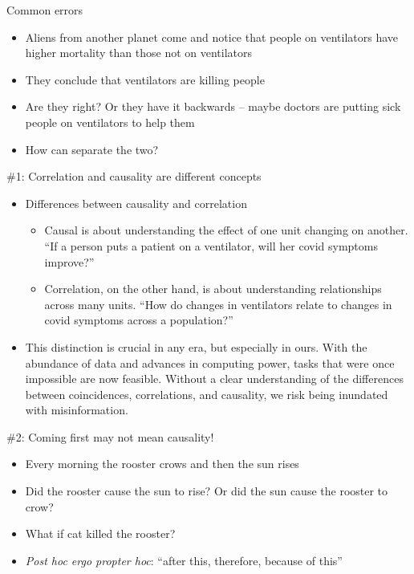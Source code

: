 \documentclass{beamer}
\begin{document}
\begin{frame}{Common errors}

  \begin{itemize}
    \item Aliens from another planet come and notice that people on ventilators have higher mortality than those not on ventilators
    \item They conclude that ventilators are killing people
    \item Are they right?  Or  they have it backwards -- maybe doctors are putting sick people on ventilators to help them
    \item How can separate the two?
  \end{itemize}

\end{frame}

\begin{frame}{\#1: Correlation and causality are different concepts}

  \begin{itemize}
  	\item Differences between causality and correlation
		\begin{itemize}
	    \item Causal is about understanding the effect of one unit changing on another. ``If a person  puts a patient on a ventilator, will her covid symptoms improve?''
	    \item Correlation, on the other hand, is about understanding relationships across many units. ``How do changes in ventilators relate to changes in covid symptoms across a population?''
	    	\end{itemize}
    \item This distinction is crucial in any era, but especially in ours. With the abundance of data and advances in computing power, tasks that were once impossible are now feasible. Without a clear understanding of the differences between coincidences, correlations, and causality, we risk being inundated with misinformation.
  \end{itemize}  
\end{frame}



\begin{frame}{\#2: Coming first may not mean causality!}

  \begin{itemize}
    \item Every morning the rooster crows and then the sun rises
    \item Did the rooster cause the sun to rise? Or did the sun cause the rooster to crow?
    \item What if cat killed the rooster?
    \item \emph{Post hoc ergo propter hoc}: ``after this, therefore, because of this''
  \end{itemize}

\end{frame}
\end{document}
